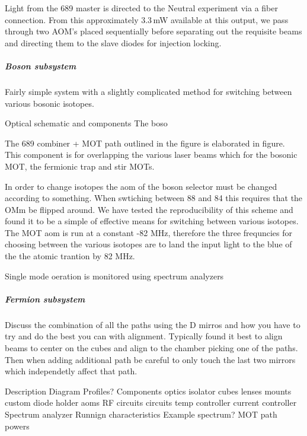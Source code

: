 Light from the 689 master is directed to the Neutral experiment via a fiber connection.
From this approximately 3.3\,mW available at this output, we pass through two AOM's placed sequentially before separating out the requisite beams and directing them to the slave diodes for injection locking.

\subparagraph{Boson subsystem}
Fairly simple system with a slightly complicated method for switching between various bosonic isotopes.

Optical schematic and components
The boso

The 689 combiner + MOT path outlined in the figure is elaborated in figure.
This component is for overlapping the various laser beams which for the bosonic MOT, the fermionic trap and stir MOTs.

In order to change isotopes the aom of the boson selector must be changed according to something.
When swtiching between 88 and 84 this requires that the OMm be flipped around.
We have tested the reproducibility of this scheme and found it to be a simple of effective means for switching between various isotopes.
The MOT aom is run at a constant -82 MHz, therefore the three frequncies for choosing between the various isotopes are to land the input light to the blue of the the atomic trantion by 82 MHz.

Single mode oeration is monitored using spectrum analyzers 




\subparagraph{Fermion subsystem}
Discuss the combination of all the paths using the D mirros and how you have to try and do the best you can with alignment. Typically found it best to align beams to center on the cubes and align to the chamber picking one of the paths. Then when adding additional path be careful to only touch the last two mirrors which independetly affect that path.


Description
Diagram
	Profiles?
Components
	optics
		isolator
		cubes
		lenses
	mounts
		custom diode holder
	aoms
		RF circuits
	circuits
		temp controller
		current controller
	Spectrum analyzer
Runnign characteristics
	Example spectrum?
	MOT path powers


